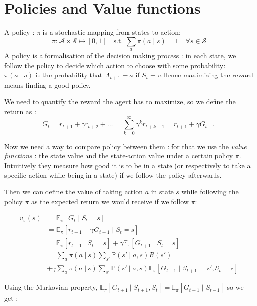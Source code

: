 \documentclass[14pt,a4paper]{article}
\theoremstyle{definition}
\begin{document}
\section{Policies and Value functions}

A policy : $\pi $ is a stochastic mapping from states to action: $$ \pi : \mathcal{A} \times \mathcal{S} \mapsto [0,1] \quad \text{s.t. } \sum_{a}\pi(a\mid s)=1 \quad \forall s \in \mathcal{S}$$
A policy is a formalisation of the decision making process : in each state, we follow the policy to decide which action to choose with some probability: $\pi(a\mid s) $ is the probability that $A_{t+1}=a$ if $S_t=s$.Hence maximizing the reward means finding a good policy.


We need to quantify the reward the agent has to maximize, so we define the return as : 
$$G_t= r_{t+1}+\gamma r_{t+2}+ \dots = \sum_{k=0}^{\infty}\gamma^{k}r_{t+k+1} = r_{t+1} + \gamma G_{t+1} $$





Now we need a way to compare policy between them : for that we use the \emph{value functions} : the state value and the state-action value under a certain policy $\pi$. Intuitively they measure how good it is to be in a state (or respectively to take a specific action while being in a state) if we follow the policy afterwards.


Then we can define the value of taking action $a$ in state $s$ while following the policy $\pi$ as the expected return we would receive if we follow $\pi$:


\begin{equation*}
\begin{split}
v_{\pi}(s)&= \mathbb{E}_{\pi}[G_t \mid S_t=s]
\\&=\mathbb{E}_{\pi}\left[ r_{t+1} + \gamma G_{t+1} \mid S_t = s\right]
\\&=\mathbb{E}_{\pi}\left[ r_{t+1} \mid S_t = s \right] + \gamma \mathbb{E}_{\pi}\left[G_{t+1} \mid S_t = s \right]
\\&=\sum_{a}\pi(a \mid s)\sum_{s'}\mathbb{P}(s' \mid a,s)R(s') 
\\&+ \gamma \sum_{a}\pi(a \mid s)\sum_{s'}\mathbb{P}(s'\mid a,s)\mathbb{E}_{\pi}\left[G_{t+1} \mid S_{t+1} = s', S_{t}= s\right]
\end{split}
\end{equation*}

Using the Markovian property, $\mathbb{E}_{\pi}\left[G_{t+1} \mid S_{t+1}, S_{t}\right] = \mathbb{E}_{\pi}\left[G_{t+1} \mid S_{t+1}\right] $ so we get : 
\end{document}
